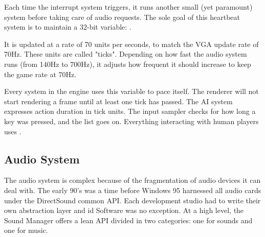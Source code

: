 \documentclass[book.tex]{subfiles}
\begin{document}
\par
Each time the interrupt system triggers, it runs another small (yet paramount) system before taking care of audio requests. The sole goal of this heartbeat system is to maintain a 32-bit variable: .

\par
\begin{minipage}{\textwidth}

\end{minipage}

\par
It is updated at a rate of 70 units per seconds, to match the VGA update rate of 70Hz. These units are called "ticks". Depending on how fast the audio system runs (from 140Hz to 700Hz), it adjusts how frequent it should increase  to keep the game rate at 70Hz.\\

\par
Every system in the engine uses this variable to pace itself. The renderer will not start rendering a frame until at least one tick has passed. The AI system expresses action duration in tick units. The input sampler checks for how long a key was pressed, and the list goes on. Everything interacting with human players uses .


\subsection{Audio System}
The audio system is complex because of the fragmentation of audio devices it can deal with. The early 90's was a time before Windows 95 harnessed all audio cards under the DirectSound common API. Each development studio had to write their own abstraction layer and id Software was no exception. At a high level, the Sound Manager offers a lean API divided in two categories: one for sounds and one for music.\\

\par
\begin{minipage}{\textwidth}

\end{minipage}
\par
\begin{minipage}{\textwidth}

\end{minipage}
\par
\vspace{10pt}
\end{document}
